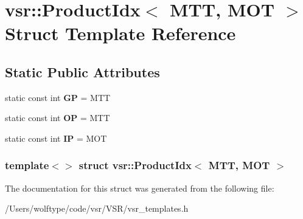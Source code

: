 \hypertarget{structvsr_1_1_product_idx_3_01_m_t_t_00_01_m_o_t_01_4}{\section{vsr\-:\-:Product\-Idx$<$ M\-T\-T, M\-O\-T $>$ Struct Template Reference}
\label{structvsr_1_1_product_idx_3_01_m_t_t_00_01_m_o_t_01_4}
}
\subsection*{Static Public Attributes}
\begin{DoxyCompactItemize}
\item 
\hypertarget{structvsr_1_1_product_idx_3_01_m_t_t_00_01_m_o_t_01_4_a9ce73487951b9b1f4f162990712209b1}{static const int {\bfseries G\-P} = M\-T\-T}\label{structvsr_1_1_product_idx_3_01_m_t_t_00_01_m_o_t_01_4_a9ce73487951b9b1f4f162990712209b1}

\item 
\hypertarget{structvsr_1_1_product_idx_3_01_m_t_t_00_01_m_o_t_01_4_aa196aa261f4759233e87c05b74daf128}{static const int {\bfseries O\-P} = M\-T\-T}\label{structvsr_1_1_product_idx_3_01_m_t_t_00_01_m_o_t_01_4_aa196aa261f4759233e87c05b74daf128}

\item 
\hypertarget{structvsr_1_1_product_idx_3_01_m_t_t_00_01_m_o_t_01_4_a9a71fb59c94525781dbaecc02bf340a5}{static const int {\bfseries I\-P} = M\-O\-T}\label{structvsr_1_1_product_idx_3_01_m_t_t_00_01_m_o_t_01_4_a9a71fb59c94525781dbaecc02bf340a5}

\end{DoxyCompactItemize}
\subsubsection*{template$<$$>$ struct vsr\-::\-Product\-Idx$<$ M\-T\-T, M\-O\-T $>$}



The documentation for this struct was generated from the following file\-:\begin{DoxyCompactItemize}
\item 
/\-Users/wolftype/code/vsr/\-V\-S\-R/vsr\-\_\-templates.\-h\end{DoxyCompactItemize}
